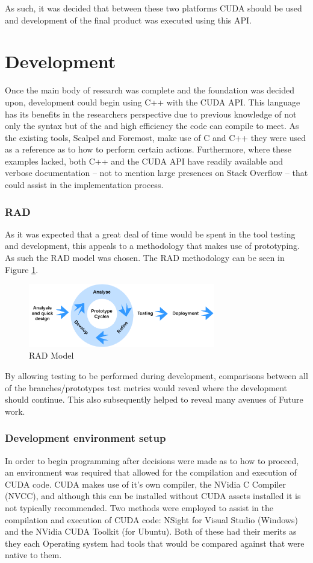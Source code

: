 As such, it was decided that between these two platforms CUDA should be used and development of the final product was executed using this \ac{API}.

\section{Development}
Once the main body of research was complete and the foundation was decided upon, development could begin using C++ with the CUDA \ac{API}.
This language has its benefits in the researchers perspective due to previous knowledge of not only the syntax but of the and high efficiency the code can compile to meet.
As the existing tools, Scalpel and Foremost, make use of C and C++ they were used as a reference as to how to perform certain actions.
Furthermore, where these examples lacked, both C++ and the CUDA \ac{API} have readily available and verbose documentation -- not to mention large presences on Stack Overflow -- that could assist in the implementation process.

\subsubsection*{\acl{RAD}}
As it was expected that a great deal of time would be spent in the tool testing and development, this appeals to a methodology that makes use of proto\-typing.
As such the \acf{RAD} model was chosen. The \ac{RAD} methodology can be seen in Figure \ref{fig:RAD}.

\begin{figure}[!ht]
    \centering
    \includegraphics[width=230pt]{Images/RAD.png}
    \caption{\acl{RAD} Model}
    \label{fig:RAD}
\end{figure} 

By allowing testing to be performed during development, comparisons between all of the branches/prototypes test metrics would reveal where the development should continue.
This also subsequently helped to reveal many avenues of Future work.

\subsubsection*{Development environment setup} %
In order to begin programming after decisions were made as to how to proceed, an environment was required that allowed for the compilation and execution of CUDA code.
CUDA makes use of it's own compiler, the NVidia C Compiler (NVCC), and although this can be installed without CUDA assets installed it is not typically recommended.
Two methods were employed to assist in the compilation and execution of CUDA code: NSight for Visual Studio (Windows) and the NVidia CUDA Toolkit (for Ubuntu).
Both of these had their merits as they each Operating system had tools that would be compared against that were native to them.


